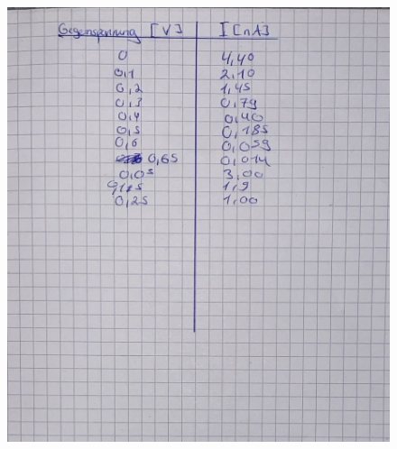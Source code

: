 \begin{figure}[H]
  \centering
  \includegraphics[width=\textwidth]{content/Bilder/Originaldaten_2.jpeg}
  \label{fig:Messungen_2}
\end{figure}
